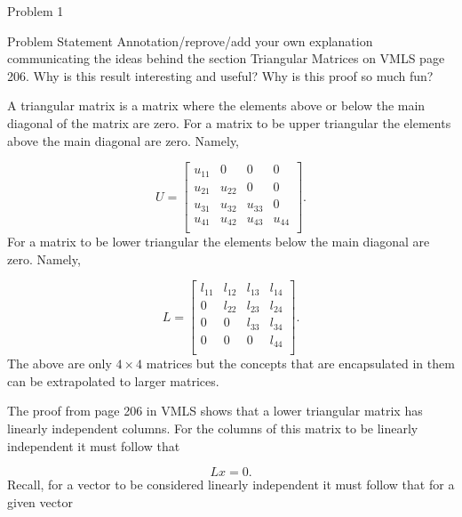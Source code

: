 \begin{problem}{Problem 1}
    \begin{statement}{Problem Statement}
        Annotation/reprove/add your own explanation communicating the ideas behind the section Triangular Matrices on VMLS page 206. Why is this result interesting and useful? Why is this proof so much fun?        
    \end{statement}

    \begin{highlight}[Solution]
        A triangular matrix is a matrix where the elements above or below the main diagonal of the matrix are zero. For a matrix to be upper triangular the elements above the main diagonal are zero. Namely,

        \begin{equation*}
            U =
            \begin{bmatrix}
                u_{11} & 0 & 0 & 0 \\
                u_{21} & u_{22} & 0 & 0 \\
                u_{31} & u_{32} & u_{33} & 0 \\
                u_{41} & u_{42} & u_{43} & u_{44} \\
            \end{bmatrix}.
        \end{equation*}
        For a matrix to be lower triangular the elements below the main diagonal are zero. Namely,

        \begin{equation*}
            L = 
            \begin{bmatrix}
                l_{11} & l_{12} & l_{13} & l_{14} \\
                0 & l_{22} & l_{23} & l_{24} \\
                0 & 0 & l_{33} & l_{34} \\
                0 & 0 & 0 & l_{44} \\
            \end{bmatrix}.
        \end{equation*}
        The above are only $4 \times 4$ matrices but the concepts that are encapsulated in them can be extrapolated to larger matrices.

        The proof from page 206 in VMLS shows that a lower triangular matrix has linearly independent columns. For the columns of this matrix to be linearly independent it must follow that

        \setcounter{equation}{0}
        \begin{equation}
            Lx = 0.
        \end{equation}
        Recall, for a vector to be considered linearly independent it must follow that for a given vector


\end{highlight}
\end{problem}
